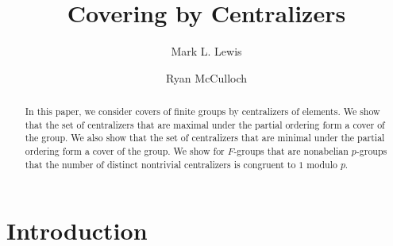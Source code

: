 \documentclass[12pt]{amsart}
\title [Covering  by Centralizers]{Covering by Centralizers}
\author[Lewis]{Mark L. Lewis}
\author[McCulloch]{Ryan McCulloch}
\date{}
\begin{document}
	
\begin{abstract}
In this paper, we consider covers of finite groups by centralizers of elements.  We show that the set of centralizers that are maximal under the partial ordering form a cover of the group.  We also show that the set of centralizers that are minimal under the partial ordering form a cover of the group.  We show for $F$-groups that are nonabelian $p$-groups that the number of  distinct nontrivial centralizers is congruent to $1$ modulo $p$.
\end{abstract}





\maketitle    
	
\section{Introduction}
\end{document}
